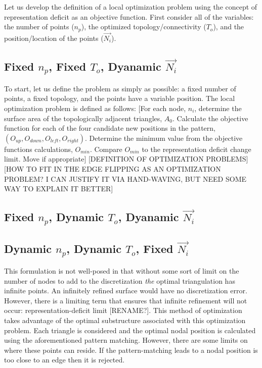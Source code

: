 Let us develop the definition of a local optimization problem using the
concept of representation deficit as an objective function. First
consider all of the variables: the number of points ($n_p$), the
optimized topology/connectivity ($T_o$), and the position/location of
the points ($\vec{N_i}$).

\subsection{Fixed $n_p$, Fixed $T_o$, Dyanamic $\vec{N_i}$}
To start, let us define the problem as simply as possible: a fixed
number of points, a fixed topology, and the points have a variable
position.  The local optimization problem is defined as follows: [For
each node, $n_i$, determine the surface area of the topologically
adjacent triangles, $A_0$. Calculate the objective function for each of
the four candidate new positions in the pattern, $\left(O_{up},
O_{down}, O_{left}, O_{right}\right)$. Determine the minimum value from
the objective functions calculations, $O_{min}$. Compare $O_{min}$ to
the representation deficit change limit. Move if appropriate]
[DEFINITION OF OPTIMIZATION PROBLEMS]
[HOW TO FIT IN THE EDGE FLIPPING AS AN OPTIMIZATION PROBLEM? I CAN
JUSTIFY IT VIA HAND-WAVING, BUT NEED SOME WAY TO EXPLAIN IT BETTER]


\subsection{Fixed $n_p$, Dynamic $T_o$, Dyanamic $\vec{N_i}$}

\subsection{Dynamic $n_p$, Dynamic $T_o$, Fixed $\vec{N_i}$}
This formulation is not well-posed in that without some sort of limit on
the number of nodes to add to the discretization {\it the} optimal
triangulation has infinite points. An infinitely refined surface would
have no discretization error. However, there is a limiting term that
ensures that infinite refinement will not occur: representation-deficit
limit [RENAME?]. This method of optimization takes advantage of the
optimal substructure associated with this optimization problem. Each
triangle is considered and the optimal nodal position is calculated
using the aforementioned pattern matching. However, there are some
limits on where these points can reside. If the pattern-matching leads
to a nodal position is too close to an edge then it is rejected.

